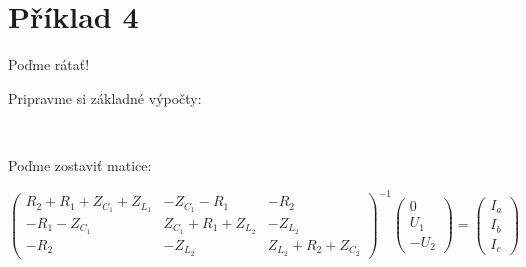 \section{Příklad 4}



\bigskip
\centerline{\Large{Poďme rátať!}}
\centerline{Pripravme si základné výpočty:}
\bigskip

\centering
{}
\\
\bigskip
\centerline{Poďme zostaviť matice:}
\centering
\[
\begin{pmatrix}

R_2 + R_1 + Z_{C_1} + Z_{L_1} & - Z_{C_1} - R_1 & - R_2\\
- R_1 - Z_{C_1} & Z_{C_1} + R_1 + Z_{L_2} & -Z_{L_2}\\
- R_2 & - Z_{L_2} & Z_{L_2} + R_2 + Z_{C_2}

\end{pmatrix}^{-1}
\begin{pmatrix}
    0\\
    U_1\\
    -U_2
\end{pmatrix}
=
\begin{pmatrix}
    I_a\\
    I_b\\
    I_c
\end{pmatrix}
\]\\
\bigskip

